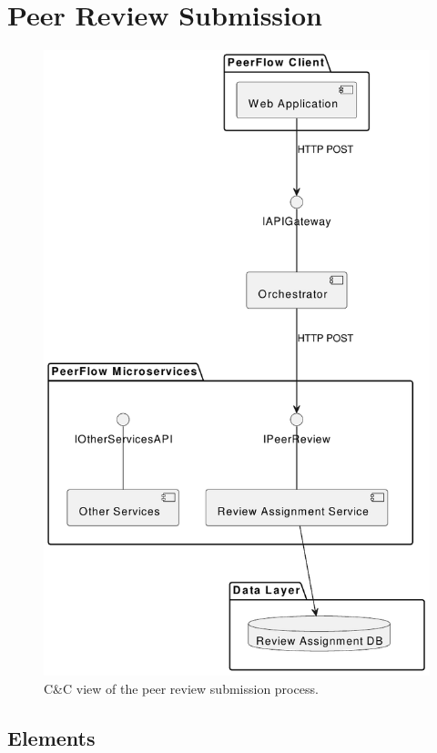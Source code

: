 \clearpage
\section{Peer Review Submission}

\begin{figure}[h]
    \centering
    \includegraphics[width=0.5\linewidth]{Architettura/imgs/pr_subm_cnc.pdf}
    \caption{C\&C view of the peer review submission process.}
    \label{fig:ccPeerReviewSubmission}
\end{figure}
\clearpage

\subsection{Elements}

